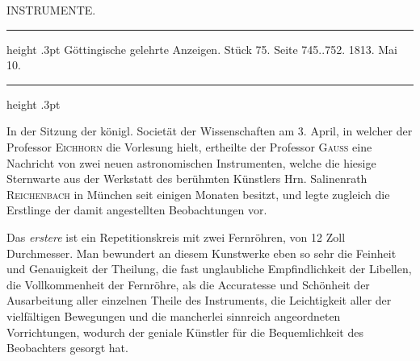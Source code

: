 \par\bigskip{}
\hypertarget{native-370-lower}{}\label{native-370-lower}
\begin{center}\large INSTRUMENTE.\end{center}
\begin{center}\parbox{.90\linewidth}{\centering\small\frenchspacing
\hrule height .3pt\relax\vspace{2.5pt}
Göttingische gelehrte Anzeigen. Stück 75. Seite 745..752. 1813. Mai 10.\par
\vspace{2.5pt}\hrule height .3pt\relax
}\end{center}

\par\indent In der Sitzung der königl. Societät der Wissenschaften am 3. April, in welcher der Professor \textsc{Eichhorn} die Vorlesung hielt, ertheilte der Professor \textsc{Gauss} eine Nachricht von zwei neuen astronomischen Instrumenten, welche die hiesige Sternwarte aus der Werkstatt des berühmten Künstlers Hrn. Salinenrath \textsc{Reichenbach} in München seit einigen Monaten besitzt, und legte zugleich die Erstlinge der damit angestellten Beobachtungen vor.

\par\indent Das \emph{erstere} ist ein Repetitionskreis mit zwei Fernröhren, von 12 Zoll Durchmesser. Man bewundert an diesem Kunstwerke eben so sehr die Feinheit und Genauigkeit der Theilung, die fast unglaubliche Empfindlichkeit der Libellen, die Vollkommenheit der Fernröhre, als die Accuratesse und Schönheit der Ausarbeitung aller einzelnen Theile des Instruments, die Leichtigkeit aller der vielfältigen Bewegungen und die mancherlei sinnreich angeordneten Vorrichtungen, wodurch der geniale Künstler für die Bequemlichkeit des Beobachters gesorgt hat.

